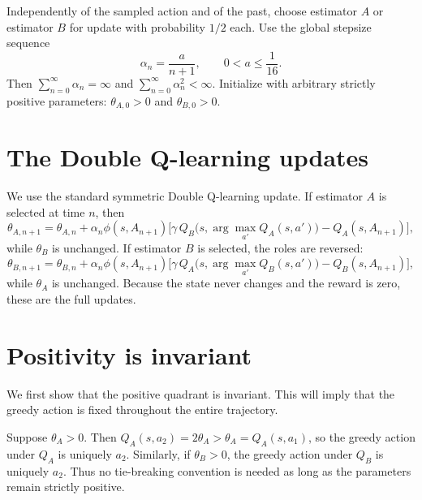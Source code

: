 \documentclass[11pt]{article}
\begin{document}
Independently of the sampled action and of the past, choose estimator $A$ or estimator $B$ for update with probability $1/2$ each. Use the global stepsize sequence
\begin{equation}\label{eq:stepsize}
\alpha_n = \frac{a}{n+1}, \qquad 0 < a \leq \frac{1}{16}.
\end{equation}
Then $\sum_{n=0}^{\infty} \alpha_n = \infty$ and $\sum_{n=0}^{\infty} \alpha_n^2 < \infty$. Initialize with arbitrary strictly positive parameters: $\theta_{A,0} > 0$ and $\theta_{B,0} > 0$.

\section{The Double Q-learning updates}

We use the standard symmetric Double Q-learning update. If estimator $A$ is selected at time $n$, then
\begin{equation}\label{eq:update-a}
\theta_{A,n+1}
= \theta_{A,n}
+ \alpha_n \phi(s, A_{n+1})
\bigl[\gamma\, Q_B\bigl(s, \arg\max_{a'} Q_A(s,a')\bigr) - Q_A(s, A_{n+1})\bigr],
\end{equation}
while $\theta_B$ is unchanged. If estimator $B$ is selected, the roles are reversed:
\begin{equation}\label{eq:update-b}
\theta_{B,n+1}
= \theta_{B,n}
+ \alpha_n \phi(s, A_{n+1})
\bigl[\gamma\, Q_A\bigl(s, \arg\max_{a'} Q_B(s,a')\bigr) - Q_B(s, A_{n+1})\bigr],
\end{equation}
while $\theta_A$ is unchanged. Because the state never changes and the reward is zero, these are the full updates.

\section{Positivity is invariant}

We first show that the positive quadrant is invariant. This will imply that the greedy action is fixed throughout the entire trajectory.

Suppose $\theta_A > 0$. Then $Q_A(s,a_2) = 2\theta_A > \theta_A = Q_A(s,a_1)$, so the greedy action under $Q_A$ is uniquely $a_2$. Similarly, if $\theta_B > 0$, the greedy action under $Q_B$ is uniquely $a_2$. Thus no tie-breaking convention is needed as long as the parameters remain strictly positive.
\end{document}
